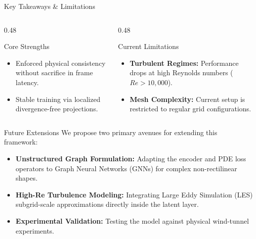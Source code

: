 \documentclass[aspectratio=169,10pt]{beamer}
\begin{document}
\begin{frame}{Key Takeaways \& Limitations}
  \begin{columns}[T]
    \begin{column}{0.48\textwidth}
      \begin{defenseblock}{Core Strengths}
        \begin{itemize}
          \item Enforced physical consistency without sacrifice in frame latency.
          \item Stable training via localized divergence-free projections.
        \end{itemize}
      \end{defenseblock}
    \end{column}
    \begin{column}{0.48\textwidth}
      \begin{defenseblock}{Current Limitations}
        \begin{itemize}
          \item \textbf{Turbulent Regimes:} Performance drops at high Reynolds numbers ($Re > 10,000$).
          \item \textbf{Mesh Complexity:} Current setup is restricted to regular grid configurations.
        \end{itemize}
      \end{defenseblock}
    \end{column}
  \end{columns}
\end{frame}

\begin{frame}{Future Extensions}
  We propose two primary avenues for extending this framework:
  \vspace{0.4cm}
  \begin{itemize}
    \item \textbf{Unstructured Graph Formulation:} Adapting the encoder and PDE loss operators to Graph Neural Networks (GNNs) for complex non-rectilinear shapes.
    \item \textbf{High-Re Turbulence Modeling:} Integrating Large Eddy Simulation (LES) subgrid-scale approximations directly inside the latent layer.
    \item \textbf{Experimental Validation:} Testing the model against physical wind-tunnel experiments.
  \end{itemize}
\end{frame}
\end{document}
